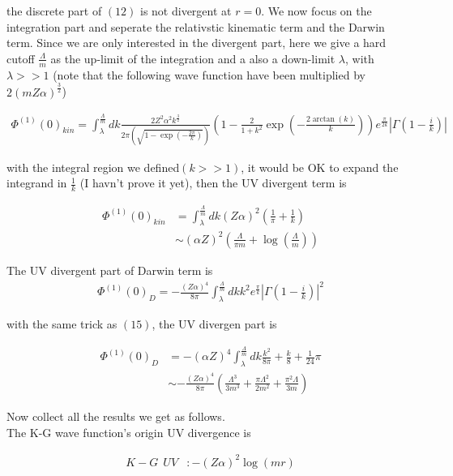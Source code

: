 \documentclass{article}
\begin{document}
the discrete part of $(12)$ is not divergent at $r=0$. We now focus on the integration part and seperate the relativstic kinematic term and the Darwin term. Since we are only interested in the divergent part, here we give a hard cutoff $\frac{\Lambda}{m}$ as the up-limit of the integration and a also a down-limit $\lambda$, with $\lambda>>1$ (note that the following wave function have been multiplied by $2(mZ\alpha)^\frac{3}{2}$)

\begin{align}
	\Phi^{(1)}(0)_{kin}=\int_\lambda^\frac{\Lambda}{m}dk \frac{2Z^2\alpha^2k^\frac{3}{2}}{2\pi(\sqrt{1-\exp(-\frac{2 \pi}{k})})}(1-\frac{2}{1+k^2}\exp(-\frac{2\arctan(k)}{k}))e^\frac{\pi}{2k}|\Gamma(1-\frac{i}{k})|
\end{align}

with the integral region we defined$(k>>1)$, it would be OK to expand the integrand in $\frac{1}{k}$ (I havn't prove it yet), then the UV divergent term is

\begin{align}
	\Phi^{(1)}(0)_{kin} & =\int_\lambda^\frac{\Lambda}{m}dk(Z\alpha)^2(\frac{1}{\pi}+\frac{1}{k}) \\
	                    & \sim(\alpha Z)^2(\frac{\Lambda}{\pi m}+\log(\frac{\Lambda}{m}))
\end{align}

The UV divergent part of Darwin term is
\begin{align}
	\Phi^{(1)}(0)_D=-\frac{(Z\alpha)^4}{8\pi}\int_\lambda^\frac{\Lambda}{m}dkk^2e^\frac{\pi}{k}|\Gamma(1-\frac{i}{k})|^2
\end{align}

with the same trick as $(15)$, the UV divergen part is

\begin{align}
	\Phi^{(1)}(0)_{D} & =-(\alpha Z)^4\int_\lambda^\frac{\Lambda}{m}dk\frac{k^2}{8\pi}+\frac{k}{8}+\frac{1}{24}\pi               \\
	                  & \sim -\frac{(Z\alpha)^4}{8\pi}(\frac{\Lambda^3}{3m^3}+\frac{\pi\Lambda^2}{2m^2}+\frac{\pi^2\Lambda}{3m})
\end{align}

Now collect all the results we get as follows.\\
The K-G wave function's origin UV divergence is

\begin{align}
	K-G\ \ UV & :-(Z\alpha)^2\log(m r)
\end{align}
\end{document}
